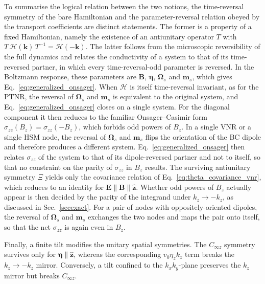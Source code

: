 \documentclass[aps,prb,onecolumn,nofootinbib,citeautoscript,10pt]{revtex4-2}
\newcommand{\bs}[1]{\boldsymbol{#1}}
\begin{document}
To summarise the logical relation between the two notions, the time-reversal symmetry of the bare Hamiltonian and the parameter-reversal relation obeyed by the transport coefficients are distinct statements. The former is a property of a fixed Hamiltonian, namely the existence of an antiunitary operator $T$ with $T\,\mathcal H(\bs k)\,T^{-1}=\mathcal H(-\bs k)$. The latter follows from the microscopic reversibility of the full dynamics and relates the conductivity of a system to that of its time-reversed partner, in which every time-reversal-odd parameter is reversed. In the Boltzmann response, these parameters are $\bs B$, $\bs\eta$, $\bs\Omega_s$ and $\bs m_s$, which gives Eq.~\eqref{eq:generalized_onsager}. When $\mathcal H$ is itself time-reversal invariant, as for the PTNR, the reversal of $\bs\Omega_s$ and $\bs m_s$ is equivalent to the original system, and Eq.~\eqref{eq:generalized_onsager} closes on a single system. For the diagonal component it then reduces to the familiar Onsager--Casimir form $\sigma_{zz}(B_z)=\sigma_{zz}(-B_z)$, which forbids odd powers of $B_z$. In a single VNR or a single HSM node, the reversal of $\bs\Omega_s$ and $\bs m_s$ flips the orientation of the BC dipole and therefore produces a different system. Eq.~\eqref{eq:generalized_onsager} then relates $\sigma_{zz}$ of the system to that of its dipole-reversed partner and not to itself, so that no constraint on the parity of $\sigma_{zz}$ in $B_z$ results. The surviving antiunitary symmetry $\Xi$ yields only the covariance relation of Eq.~\eqref{eq:theta_covariance_vnr}, which reduces to an identity for $\bs E\parallel\bs B\parallel\hat{\bs z}$. Whether odd powers of $B_z$ actually appear is then decided by the parity of the integrand under $k_z\to-k_z$, as discussed in Sec.~\ref{secexact}. For a pair of nodes with oppositely-oriented dipoles, the reversal of $\bs\Omega_s$ and $\bs m_s$ exchanges the two nodes and maps the pair onto itself, so that the net $\sigma_{zz}$ is again even in $B_z$.

Finally, a finite tilt modifies the unitary spatial symmetries. The $C_{\infty z}$ symmetry survives only for $\bs\eta\parallel\hat{\bs z}$, whereas the corresponding $v_0\eta_z k_z$ term breaks the $k_z\to-k_z$ mirror. Conversely, a tilt confined to the $k_xk_y$-plane preserves the $k_z$ mirror but breaks $C_{\infty z}$.
\end{document}
